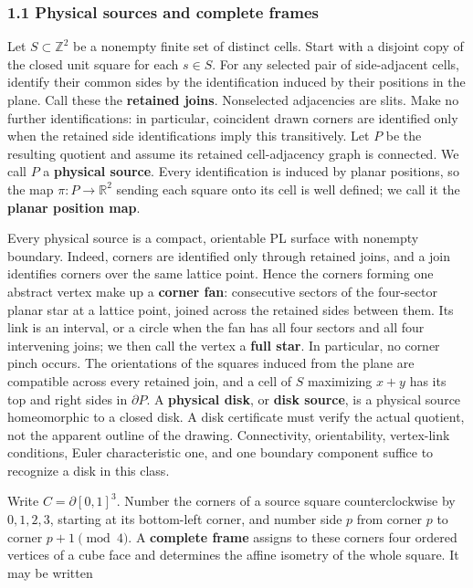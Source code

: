 \documentclass[
  11pt,
]{article}
\newcounter{none} %
\begin{document}
\subsubsection{1.1 Physical sources and complete
frames}\label{physical-sources-and-complete-frames}

Let \(S\subset\mathbb Z^2\) be a nonempty finite set of distinct cells.
Start with a disjoint copy of the closed unit square for each
\(s\in S\). For any selected pair of side-adjacent cells, identify their
common sides by the identification induced by their positions in the
plane. Call these the \textbf{retained joins}. Nonselected adjacencies
are slits. Make no further identifications: in particular, coincident
drawn corners are identified only when the retained side identifications
imply this transitively. Let \(P\) be the resulting quotient and assume
its retained cell-adjacency graph is connected. We call \(P\) a
\textbf{physical source}. Every identification is induced by planar
positions, so the map \(\pi:P\to\mathbb R^2\) sending each square onto
its cell is well defined; we call it the \textbf{planar position map}.

Every physical source is a compact, orientable PL surface with nonempty
boundary. Indeed, corners are identified only through retained joins,
and a join identifies corners over the same lattice point. Hence the
corners forming one abstract vertex make up a \textbf{corner fan}:
consecutive sectors of the four-sector planar star at a lattice point,
joined across the retained sides between them. Its link is an interval,
or a circle when the fan has all four sectors and all four intervening
joins; we then call the vertex a \textbf{full star}. In particular, no
corner pinch occurs. The orientations of the squares induced from the
plane are compatible across every retained join, and a cell of \(S\)
maximizing \(x+y\) has its top and right sides in \(\partial P\). A
\textbf{physical disk}, or \textbf{disk source}, is a physical source
homeomorphic to a closed disk. A disk certificate must verify the actual
quotient, not the apparent outline of the drawing. Connectivity,
orientability, vertex-link conditions, Euler characteristic one, and one
boundary component suffice to recognize a disk in this class.

Write \(C=\partial[0,1]^3\). Number the corners of a source square
counterclockwise by \(0,1,2,3\), starting at its bottom-left corner, and
number side \(p\) from corner \(p\) to corner \(p+1\pmod4\). A
\textbf{complete frame} assigns to these corners four ordered vertices
of a cube face and determines the affine isometry of the whole square.
It may be written
\end{document}
